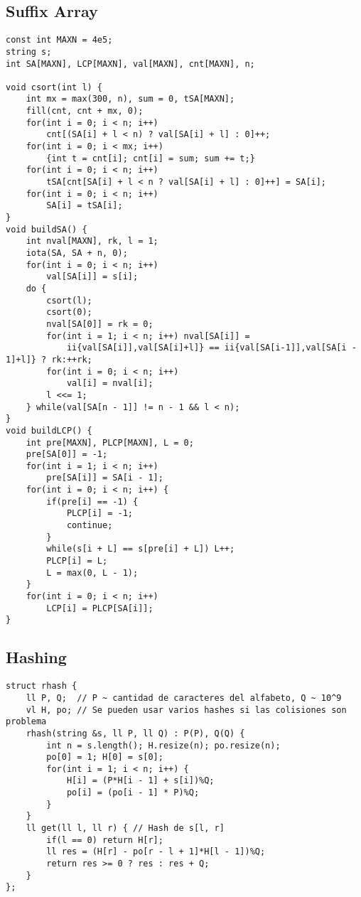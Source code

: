 \documentclass[twocolumn]{article}
\begin{document}
\subsection{Suffix Array}
\lstset{basicstyle=\footnotesize\ttfamily,breaklines=true,tabsize=2,language=C++,frame=leftline, numbers=left, numberstyle=\tiny, numbersep=5pt}
\begin{lstlisting}
const int MAXN = 4e5;
string s;
int SA[MAXN], LCP[MAXN], val[MAXN], cnt[MAXN], n;

void csort(int l) {
	int mx = max(300, n), sum = 0, tSA[MAXN];
	fill(cnt, cnt + mx, 0);
	for(int i = 0; i < n; i++)
		cnt[(SA[i] + l < n) ? val[SA[i] + l] : 0]++;
	for(int i = 0; i < mx; i++)
		{int t = cnt[i]; cnt[i] = sum; sum += t;}
	for(int i = 0; i < n; i++)
		tSA[cnt[SA[i] + l < n ? val[SA[i] + l] : 0]++] = SA[i];
	for(int i = 0; i < n; i++)
		SA[i] = tSA[i];
}
void buildSA() {
	int nval[MAXN], rk, l = 1;
	iota(SA, SA + n, 0);
	for(int i = 0; i < n; i++)
		val[SA[i]] = s[i];
	do {
		csort(l);
		csort(0);
		nval[SA[0]] = rk = 0;
		for(int i = 1; i < n; i++) nval[SA[i]] =
			ii{val[SA[i]],val[SA[i]+l]} == ii{val[SA[i-1]],val[SA[i - 1]+l]} ? rk:++rk;
		for(int i = 0; i < n; i++)
			val[i] = nval[i];
		l <<= 1;
	} while(val[SA[n - 1]] != n - 1 && l < n);
}
void buildLCP() {
	int pre[MAXN], PLCP[MAXN], L = 0;
	pre[SA[0]] = -1;
	for(int i = 1; i < n; i++)
		pre[SA[i]] = SA[i - 1];
	for(int i = 0; i < n; i++) {
		if(pre[i] == -1) {
			PLCP[i] = -1;
			continue;
		}
		while(s[i + L] == s[pre[i] + L]) L++;
		PLCP[i] = L;
		L = max(0, L - 1);
	}
	for(int i = 0; i < n; i++)
		LCP[i] = PLCP[SA[i]];
}
\end{lstlisting}
\subsection{Hashing}
\lstset{basicstyle=\footnotesize\ttfamily,breaklines=true,tabsize=2,language=C++,frame=leftline, numbers=left, numberstyle=\tiny, numbersep=5pt}
\begin{lstlisting}
struct rhash {
	ll P, Q;  // P ~ cantidad de caracteres del alfabeto, Q ~ 10^9
	vl H, po; // Se pueden usar varios hashes si las colisiones son problema
	rhash(string &s, ll P, ll Q) : P(P), Q(Q) {
		int n = s.length(); H.resize(n); po.resize(n);
		po[0] = 1; H[0] = s[0];
		for(int i = 1; i < n; i++) {
			H[i] = (P*H[i - 1] + s[i])%Q;
			po[i] = (po[i - 1] * P)%Q;
		}
	}
	ll get(ll l, ll r) { // Hash de s[l, r]
		if(l == 0) return H[r];
		ll res = (H[r] - po[r - l + 1]*H[l - 1])%Q;
		return res >= 0 ? res : res + Q;
	}
};
\end{lstlisting}
\end{document}
